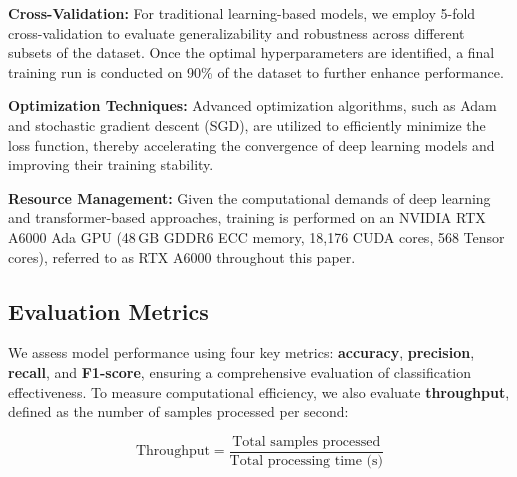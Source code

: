 \documentclass[runningheads]{llncs}
\begin{document}
\vspace{0.25\baselineskip}
\noindent  \textbf{Cross-Validation:} For traditional learning-based models, we employ 5-fold cross-validation to evaluate generalizability and robustness across different subsets of the dataset. Once the optimal hyperparameters are identified, a final training run is conducted on 90\% of the dataset to further enhance performance.
    
\vspace{0.25\baselineskip}
\noindent  \textbf{Optimization Techniques:} Advanced optimization algorithms, such as Adam and stochastic gradient descent (SGD), are utilized to efficiently minimize the loss function, thereby accelerating the convergence of deep learning models and improving their training stability.
    

\vspace{0.25\baselineskip}
\noindent \textbf{Resource Management:} Given the computational demands of deep learning and transformer-based approaches, training is performed on an NVIDIA RTX A6000 Ada GPU (48\,GB GDDR6 ECC memory, 18,176 CUDA cores, 568 Tensor cores), referred to as RTX A6000 throughout this paper.

\subsection{Evaluation Metrics}

We assess model performance using four key metrics: \textbf{accuracy}, \textbf{precision}, \textbf{recall}, and \textbf{F1-score}, ensuring a comprehensive evaluation of classification effectiveness. To measure computational efficiency, we also evaluate \textbf{throughput}, defined as the number of samples processed per second:

\begin{equation}
    \text{Throughput} = \frac{\text{Total samples processed}}{\text{Total processing time (s)}}
\end{equation}
\end{document}
